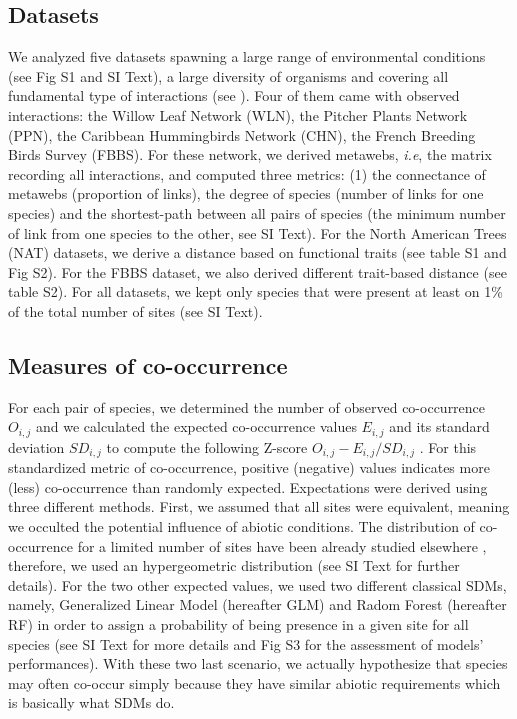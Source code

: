 \subsection{Datasets}\label{datasets}

We analyzed five datasets spawning a large range of environmental
conditions (see Fig S1 and SI Text), a large diversity of organisms and
covering all fundamental type of interactions (see \citet{tbl:id}). Four
of them came with observed interactions: the Willow Leaf Network (WLN),
the Pitcher Plants Network (PPN), the Caribbean Hummingbirds Network
(CHN), the French Breeding Birds Survey (FBBS). For these network, we
derived metawebs, \emph{i.e}, the matrix recording all interactions, and
computed three metrics: (1) the connectance of metawebs (proportion of
links), the degree of species (number of links for one species) and the
shortest-path between all pairs of species (the minimum number of link
from one species to the other, see SI Text). For the North American
Trees (NAT) datasets, we derive a distance based on functional traits
(see table S1 and Fig S2). For the FBBS dataset, we also derived
different trait-based distance (see table S2). For all datasets, we kept
only species that were present at least on 1\% of the total number of
sites (see SI Text).

\subsection{Measures of co-occurrence}\label{measures-of-co-occurrence}

For each pair of species, we determined the number of observed
co-occurrence \(O_{i,j}\) and we calculated the expected co-occurrence
values \(E_{i,j}\) and its standard deviation \(SD_{i,j}\) to compute
the following Z-score \(O_{i,j}-E_{i,j}/SD_{i,j}\) \citep{Gilpin1982}.
For this standardized metric of co-occurrence, positive (negative)
values indicates more (less) co-occurrence than randomly expected.
Expectations were derived using three different methods. First, we
assumed that all sites were equivalent, meaning we occulted the
potential influence of abiotic conditions. The distribution of
co-occurrence for a limited number of sites have been already studied
elsewhere \citep{Gilpin1982, Veech2013}, therefore, we used an
hypergeometric distribution (see SI Text for further details). For the
two other expected values, we used two different classical SDMs, namely,
Generalized Linear Model (hereafter GLM) and Radom Forest (hereafter RF)
in order to assign a probability of being presence in a given site for
all species (see SI Text for more details and Fig S3 for the assessment
of models' performances). With these two last scenario, we actually
hypothesize that species may often co-occur simply because they have
similar abiotic requirements which is basically what SDMs do.

